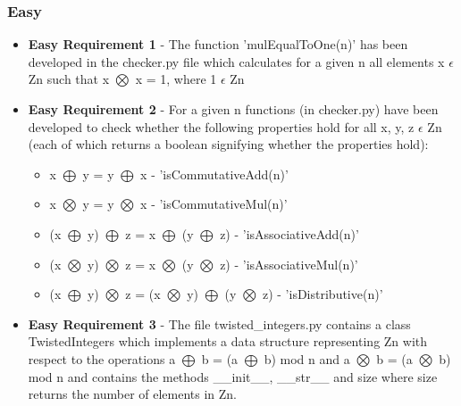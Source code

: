 \documentclass[11]{article}
\begin{document}
	 	\subsubsection{Easy}
			\begin{itemize}
				\item \textbf{Easy Requirement 1} - The function 'mulEqualToOne(n)' has been developed in the checker.py file which calculates for a given n all elements x $\epsilon$ Zn such that x $\bigotimes$ x = 1, where 1 $\epsilon$ Zn
				\item \textbf{Easy Requirement 2} - For a given n functions (in checker.py) have been developed to check whether the following properties hold for all x, y, z $\epsilon$ Zn (each of which returns a boolean signifying whether the properties hold):
				\begin{itemize}
					\item x $\bigoplus$ y = y $\bigoplus$ x - 'isCommutativeAdd(n)'
					\item x $\bigotimes$ y = y $\bigotimes$ x - 'isCommutativeMul(n)'
					\item (x $\bigoplus$ y) $\bigoplus$ z = x $\bigoplus$ (y $\bigoplus$ z) - 'isAssociativeAdd(n)'
					\item (x $\bigotimes$ y) $\bigotimes$ z = x $\bigotimes$ (y $\bigotimes$ z) - 'isAssociativeMul(n)'
					\item (x $\bigoplus$ y) $\bigotimes$ z = (x $\bigotimes$ y) $\bigoplus$ (y $\bigotimes$ z) - 'isDistributive(n)'
				\end{itemize}
				
				\item \textbf{Easy Requirement 3} - The file twisted\_integers.py contains a class TwistedIntegers which implements a data structure representing Zn with respect to the operations a $\bigoplus$ b = (a $\bigoplus$ b) mod n and a $\bigotimes$ b = (a $\bigotimes$ b) mod n and contains the methods \_\_init\_\_, \_\_str\_\_ and size where size returns the number of elements in Zn.
			\end{itemize}
\end{document}
